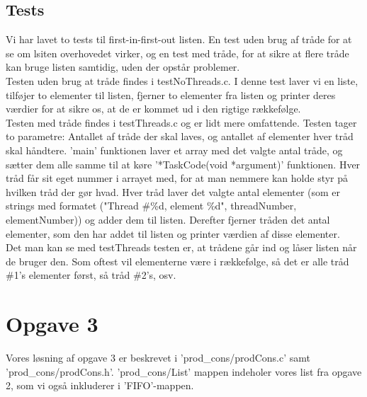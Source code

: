 \subsection{Tests}
\label{O2_Tests}
Vi har lavet to tests til first-in-first-out listen. En test uden brug af tråde for at se om lsiten overhovedet virker, og en test med tråde, for at sikre at flere tråde kan bruge listen samtidig, uden der opstår problemer.
\\Testen uden brug at tråde findes i testNoThreads.c. I denne test laver vi en liste, tilføjer to elementer til listen, fjerner to elementer fra listen og printer deres værdier for at sikre os, at de er kommet ud i den rigtige rækkefølge. 
\\Testen med tråde findes i testThreads.c og er lidt mere omfattende. Testen tager to parametre: Antallet af tråde der skal laves, og antallet af elementer hver tråd skal håndtere. 'main' funktionen laver et array med det valgte antal tråde, og sætter dem alle samme til at køre '*TaskCode(void *argument)' funktionen. Hver tråd får sit eget nummer i arrayet med, for at man nemmere kan holde styr på hvilken tråd der gør hvad. Hver tråd laver det valgte antal elementer (som er strings med formatet ("Thread \#\%d, element \%d", threadNumber, elementNumber)) og adder dem til listen. Derefter fjerner tråden det antal elementer, som den har addet til listen og printer værdien af disse elementer. 
\\Det man kan se med testThreads testen er, at trådene går ind og låser listen når de bruger den. Som oftest vil elementerne være i rækkefølge, så det er alle tråd \#1's elementer først, så tråd \#2's, osv.

\section{Opgave 3}
\label{O3}
Vores løsning af opgave 3 er beskrevet i 'prod\_cons/prodCons.c' samt 'prod\_cons/prodCons.h'. 'prod\_cons/List' mappen indeholer vores list fra opgave 2, som vi også inkluderer i 'FIFO'-mappen.

